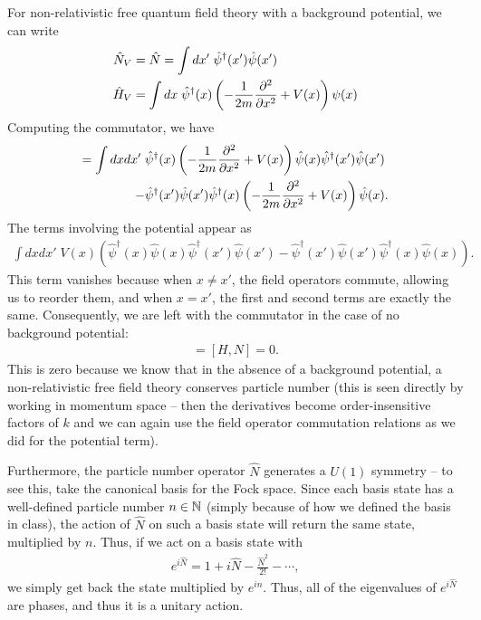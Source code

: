 \documentclass{../mathnotes}
\begin{document}
For non-relativistic free quantum field theory with a background potential, we can write
\begin{align*}
    \hat N_V&=\hat N=\int dx'\; \hat\psi^\dagger(x')\hat\psi(x')\\
    \hat H_V&=\int dx\; \hat\psi^\dagger(x)\left( -\frac{1}{2m}\frac{\partial^2}{\partial x^2}+V(x) \right)\psi(x)
\end{align*}
Computing the commutator, we have
\begin{align*}
    [\hat H_V, \hat N_V]=\int dx dx'\;&\hat\psi^\dagger(x)\left( -\frac{1}{2m}\frac{\p^2}{\p x^2}+V(x) \right)\hat\psi(x)\hat\psi^\dagger(x')\hat\psi(x')\\
    -&\hat\psi^\dagger(x')\hat\psi(x')\hat\psi^\dagger(x)\left( -\frac{1}{2m}\frac{\p^2}{\p x^2}+V(x) \right)\hat\psi(x).
\end{align*}
The terms involving the potential appear as
\begin{align*}
    \int dx dx'\;V(x)\left(\hat\psi^\dagger(x)\hat\psi(x)\hat\psi^\dagger(x')\hat\psi(x')-\hat\psi^\dagger(x')\hat\psi(x')\hat\psi^\dagger(x)\hat\psi(x)\right).
\end{align*}
This term vanishes because when $x\neq x'$, the field operators commute, allowing us to reorder them, and when $x=x'$, the first and second terms are exactly the same.
Consequently, we are left with the commutator in the case of no background potential:
\begin{align*}
    [H_V,N_V]=[H,N]=0.
\end{align*}
This is zero because we know that in the absence of a background potential, a non-relativistic free field theory conserves particle number
(this is seen directly by working in momentum space -- then the derivatives become order-insensitive factors of $k$ and we can again
use the field operator commutation relations as we did for the potential term).

Furthermore, the particle number operator $\hat N$ generates a $U(1)$ symmetry -- to see this, take the canonical basis for the Fock space.
Since each basis state has a well-defined particle number $n\in\mathbb{N}$ (simply because of how we defined the basis in class), the action of $\hat N$ on such a basis
state will return the same state, multiplied by $n$. Thus, if we act on a basis state with
\begin{align*}
    e^{i\hat N}=1+i\hat N-\frac{\hat N^2}{2!}-\cdots,
\end{align*}
we simply get back the state multiplied by $e^{in}$. Thus, all of the eigenvalues of $e^{i\hat N}$ are phases, and thus it is a unitary action.
\end{document}
